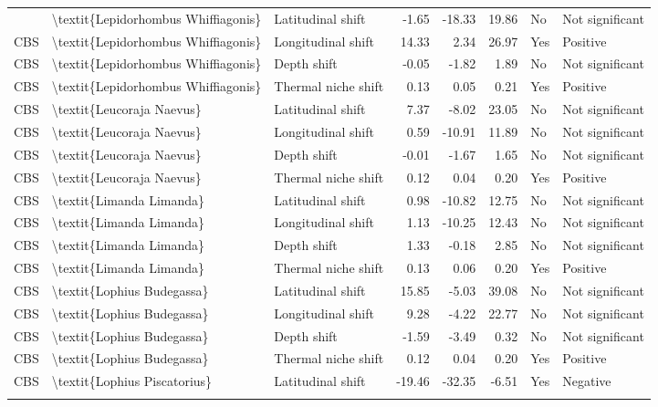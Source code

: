 \begin{longtable}[t]{lllrrrll}
{{CBS & \textbackslash{}textit\{Lepidorhombus Whiffiagonis\} & Latitudinal shift & -1.65 & -18.33 & 19.86 & No & Not significant\\
CBS & \textbackslash{}textit\{Lepidorhombus Whiffiagonis\} & Longitudinal shift & 14.33 & 2.34 & 26.97 & Yes & Positive\\
CBS & \textbackslash{}textit\{Lepidorhombus Whiffiagonis\} & Depth shift & -0.05 & -1.82 & 1.89 & No & Not significant\\
\addlinespace
CBS & \textbackslash{}textit\{Lepidorhombus Whiffiagonis\} & Thermal niche shift & 0.13 & 0.05 & 0.21 & Yes & Positive\\
CBS & \textbackslash{}textit\{Leucoraja Naevus\} & Latitudinal shift & 7.37 & -8.02 & 23.05 & No & Not significant\\
CBS & \textbackslash{}textit\{Leucoraja Naevus\} & Longitudinal shift & 0.59 & -10.91 & 11.89 & No & Not significant\\
CBS & \textbackslash{}textit\{Leucoraja Naevus\} & Depth shift & -0.01 & -1.67 & 1.65 & No & Not significant\\
CBS & \textbackslash{}textit\{Leucoraja Naevus\} & Thermal niche shift & 0.12 & 0.04 & 0.20 & Yes & Positive\\
\addlinespace
CBS & \textbackslash{}textit\{Limanda Limanda\} & Latitudinal shift & 0.98 & -10.82 & 12.75 & No & Not significant\\
CBS & \textbackslash{}textit\{Limanda Limanda\} & Longitudinal shift & 1.13 & -10.25 & 12.43 & No & Not significant\\
CBS & \textbackslash{}textit\{Limanda Limanda\} & Depth shift & 1.33 & -0.18 & 2.85 & No & Not significant\\
CBS & \textbackslash{}textit\{Limanda Limanda\} & Thermal niche shift & 0.13 & 0.06 & 0.20 & Yes & Positive\\
CBS & \textbackslash{}textit\{Lophius Budegassa\} & Latitudinal shift & 15.85 & -5.03 & 39.08 & No & Not significant\\
\addlinespace
CBS & \textbackslash{}textit\{Lophius Budegassa\} & Longitudinal shift & 9.28 & -4.22 & 22.77 & No & Not significant\\
CBS & \textbackslash{}textit\{Lophius Budegassa\} & Depth shift & -1.59 & -3.49 & 0.32 & No & Not significant\\
CBS & \textbackslash{}textit\{Lophius Budegassa\} & Thermal niche shift & 0.12 & 0.04 & 0.20 & Yes & Positive\\
CBS & \textbackslash{}textit\{Lophius Piscatorius\} & Latitudinal shift & -19.46 & -32.35 & -6.51 & Yes & Negative\\
}}
\end{longtable}
